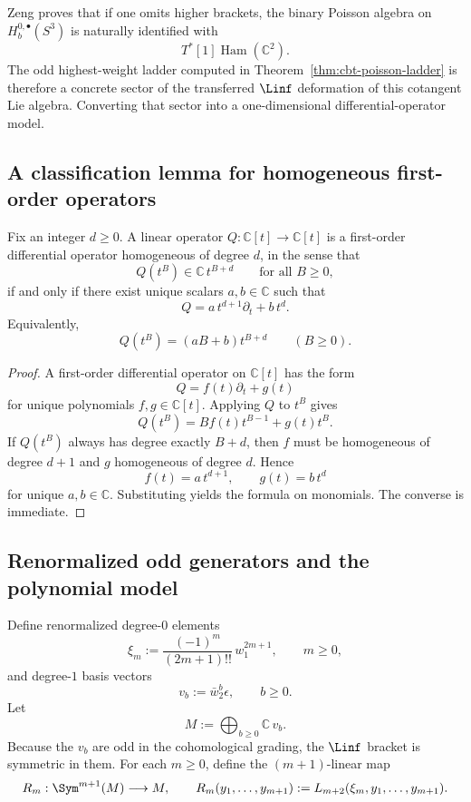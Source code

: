 Zeng proves that if one omits higher brackets, the binary Poisson algebra on $H_b^{0,\bullet}(S^3)$ is naturally identified with
\[
T^*[1]\operatorname{Ham}(\mathbb{C}^2).
\]
The odd highest-weight ladder computed in Theorem~\ref{thm:cbt-poisson-ladder} is therefore a concrete sector of the transferred $\Linf$ deformation of this cotangent Lie algebra. Converting that sector into a one-dimensional differential-operator model.

\subsection{A classification lemma for homogeneous first-order operators}

\begin{proposition}
Fix an integer $d\ge0$. A linear operator $Q:\mathbb{C}[t]\to\mathbb{C}[t]$ is a first-order differential operator homogeneous of degree $d$, in the sense that
\[
Q(t^B)\in \mathbb{C}\, t^{B+d}\qquad\text{for all }B\ge0,
\]
if and only if there exist unique scalars $a,b\in\mathbb{C}$ such that
\[
Q=a\,t^{d+1}\partial_t+b\,t^d.
\]
Equivalently,
\[
Q(t^B)=(aB+b)t^{B+d}\qquad (B\ge0).
\]
\end{proposition}

\begin{proof}
A first-order differential operator on $\mathbb{C}[t]$ has the form
\[
Q=f(t)\partial_t+g(t)
\]
for unique polynomials $f,g\in\mathbb{C}[t]$. Applying $Q$ to $t^B$ gives
\[
Q(t^B)=Bf(t)t^{B-1}+g(t)t^B.
\]
If $Q(t^B)$ always has degree exactly $B+d$, then $f$ must be homogeneous of degree $d+1$ and $g$ homogeneous of degree $d$. Hence
\[
f(t)=a\,t^{d+1},
\qquad
g(t)=b\,t^d
\]
for unique $a,b\in\mathbb{C}$. Substituting yields the formula on monomials. The converse is immediate.
\end{proof}

\subsection{Renormalized odd generators and the polynomial model}

Define renormalized degree-$0$ elements
\[
\xi_m:=\frac{(-1)^m}{(2m+1)!!}\,w_1^{2m+1},
\qquad m\ge0,
\]
and degree-$1$ basis vectors
\[
v_b:=\bar w_2^b\epsilon,
\qquad b\ge0.
\]
Let
\[
M:=\bigoplus_{b\ge0}\mathbb{C}\,v_b.
\]
Because the $v_b$ are odd in the cohomological grading, the $\Linf$ bracket is symmetric in them. For each $m\ge0$, define the $(m+1)$-linear map
\[
R_m:\Sym^{m+1}(M)\longrightarrow M,
\qquad
R_m(y_1,\dots,y_{m+1}):=
L_{m+2}(\xi_m,y_1,\dots,y_{m+1}).
\]

